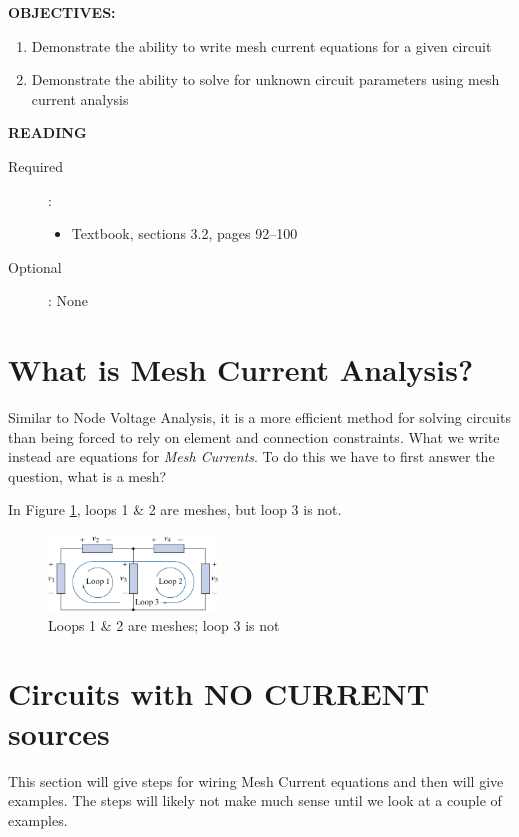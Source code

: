 \documentclass{handout}
\begin{document}
\maketitle


\textbf{OBJECTIVES:}
\begin{enumerate}
\item Demonstrate the ability to write mesh current equations for a given circuit
\item Demonstrate the ability to solve for unknown circuit parameters using mesh current analysis
\end{enumerate}

\textbf{READING}
\begin{description}
\item [Required]:
\begin{itemize}
\item  Textbook, sections 3.2, pages 92--100
\end{itemize}
\item [Optional]: None
\end{description}


\section{What is Mesh Current Analysis?}
Similar to Node Voltage Analysis, it is a more efficient method for solving circuits than being forced to rely on element and connection constraints.  What we write instead are equations for {\em Mesh Currents}.  To do this we have to first answer the question, what is a mesh?


In Figure \ref{fig: SimpleLoopCounting}, loops 1 \& 2 are meshes, but loop 3 is not.

\begin{figure} [h t b]
\centering
\includegraphics[width=0.4\textwidth]{SimpleLoopCounting.jpg}
\caption{Loops 1 \& 2 are meshes; loop 3 is not}
\label{fig: SimpleLoopCounting}
\end{figure}

\newpage
\clearpage
\pagebreak

\section{Circuits with NO CURRENT sources}
This section will give steps for wiring Mesh Current equations and then will give examples.  The steps will likely not make much sense until we look at a couple of examples.
\end{document}
